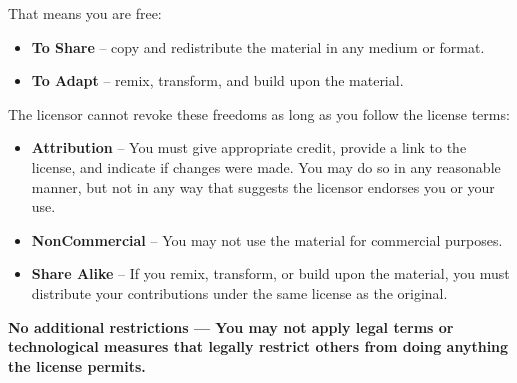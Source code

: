    \scriptsize
   \noindent \sansfont
    That means you are free:
      \begin{itemize}
        \setlength{\itemsep}{0pt}
        \setlength{\parskip}{0pt}
        \setlength{\parsep}{0pt} 
          \item \textbf{To Share} -- copy and redistribute the material in any medium or format.
         \item \textbf{To Adapt} -- remix, transform, and build upon the material.
      \end{itemize}
    The licensor cannot revoke these freedoms as long as you follow the license terms: \par
      \begin{itemize}
        \setlength{\itemsep}{0pt}
        \setlength{\parskip}{0pt}
        \setlength{\parsep}{0pt}
          \item \textbf{Attribution} -- You must give appropriate credit, provide a link to the license, and indicate if changes were made. You may do so in any reasonable manner, but not in any way that suggests the licensor endorses you or your use. \par
          \item \textbf{NonCommercial} -- You may not use the material for commercial purposes. \par
          \item \textbf{Share Alike} -- If you remix, transform, or build upon the material, you must distribute your contributions under the same license as the original. \par
      \end{itemize}
    \textbf{No additional restrictions — You may not apply legal terms or technological measures that legally restrict others from doing anything the license permits.}
    
    \vspace{.5cm}
    
